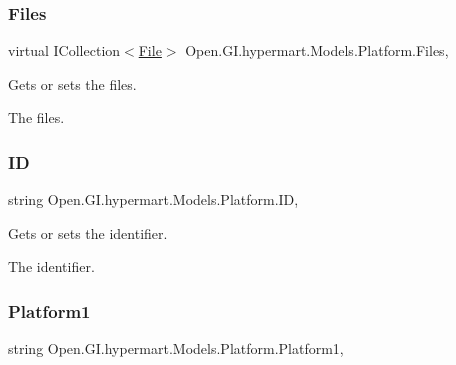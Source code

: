 \hypertarget{class_open_1_1_g_i_1_1hypermart_1_1_models_1_1_platform_a984a31b30ada1f33acef9099c09d9ca0}{}\label{class_open_1_1_g_i_1_1hypermart_1_1_models_1_1_platform_a984a31b30ada1f33acef9099c09d9ca0} 
\subsubsection{\texorpdfstring{Files}{Files}}
{\footnotesize\ttfamily virtual I\+Collection$<$\hyperlink{class_open_1_1_g_i_1_1hypermart_1_1_models_1_1_file}{File}$>$ Open.\+G\+I.\+hypermart.\+Models.\+Platform.\+Files\hspace{0.3cm}{\ttfamily [get]}, {\ttfamily [set]}}



Gets or sets the files. 

The files. \hypertarget{class_open_1_1_g_i_1_1hypermart_1_1_models_1_1_platform_ae11ad27de467131d539e35f598ff3051}{}\label{class_open_1_1_g_i_1_1hypermart_1_1_models_1_1_platform_ae11ad27de467131d539e35f598ff3051} 
\subsubsection{\texorpdfstring{ID}{ID}}
{\footnotesize\ttfamily string Open.\+G\+I.\+hypermart.\+Models.\+Platform.\+ID\hspace{0.3cm}{\ttfamily [get]}, {\ttfamily [set]}}



Gets or sets the identifier. 

The identifier. \hypertarget{class_open_1_1_g_i_1_1hypermart_1_1_models_1_1_platform_aa93619cbb18655b2425f416df0f194c6}{}\label{class_open_1_1_g_i_1_1hypermart_1_1_models_1_1_platform_aa93619cbb18655b2425f416df0f194c6} 
\subsubsection{\texorpdfstring{Platform1}{Platform1}}
{\footnotesize\ttfamily string Open.\+G\+I.\+hypermart.\+Models.\+Platform.\+Platform1\hspace{0.3cm}{\ttfamily [get]}, {\ttfamily [set]}}



